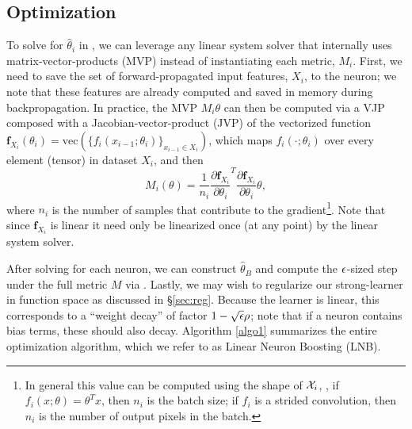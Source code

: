 \subsection{Optimization}
To solve for $\hat{\theta}_i$ in ,
we can leverage any linear system solver that internally
uses matrix-vector-products (MVP) instead of instantiating
each metric, $M_i$.
First, we need to save the set of forward-propagated input features, $X_i$, to the neuron; we note
that these features are already computed and saved in
memory during backpropagation.
In practice, the MVP $M_i \theta$ can then be computed via a
VJP composed with a Jacobian-vector-product (JVP) of
the vectorized function $\mathbf{f}_{X_i}(\theta_i) = \text{vec}(\{f_i(x_{i-1};\theta_i)\}_{x_{i-1} \in X_i})$,
which maps $f_i(\cdot; \theta_i)$ over  every element (tensor) in dataset $X_i$, and then
%
\begin{equation}
\label{eq:mvp}
M_i(\theta) = 
\frac{1}{n_i} \frac{\partial \mathbf{f}_{X_i}}{\partial \theta_i}^T \frac{\partial \mathbf{f}_{X_i}}{\partial \theta_i} \theta,
\end{equation}
%
where $n_i$ is the number of samples that contribute to the
gradient\footnote{In general this value can be computed using the shape of ${\mathcal{X}}_i$,
\eg, if $f_i(x;\theta) = \theta^Tx$, then $n_i$ is
the batch size; if $f_i$ is a strided convolution, then $n_i$ 
is the number of output pixels in the batch.}.
Note that since $\mathbf{f}_{X_i}$ is linear it need only be
linearized once (at any point) by the linear system solver.

After solving  for each neuron, we can construct $\hat{\theta}_B$ and
compute the ${\epsilon}$-sized step under the full metric $M$ via .
Lastly, we may wish to regularize our strong-learner in function space as discussed in 
\S \ref{sec:reg}. Because the learner is linear, this corresponds to a 
``weight decay'' of factor $1-\sqrt{{\epsilon}} \rho$; note that if a neuron contains
bias terms, these should also decay.
Algorithm \ref{algo1} summarizes the entire optimization algorithm, which
we refer to as Linear Neuron Boosting (LNB).

